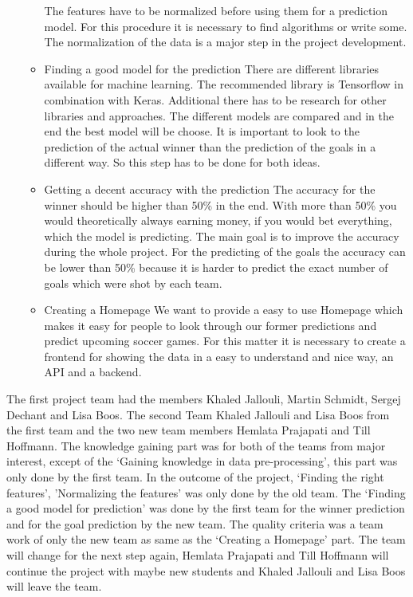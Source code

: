 \begin{itemize}
\begin{itemize}
			The features have to be normalized before using them for a prediction model. For this procedure it is necessary to find algorithms or write some. The normalization of the data is a major step in the project development.
			\item Finding a good model for the prediction\newline 
			There are different libraries available for machine learning. The recommended library is Tensorflow in combination with Keras. Additional there has to be research for other libraries and approaches. The different models are compared and in the end the best model will be choose. It is important to look to the prediction of the actual winner than the prediction of the goals in a different way. So this step has to be done for both ideas.
			\item Getting a decent accuracy with the prediction \newline
			The accuracy for the winner should be higher than 50\% in the end. With more than 50\% you would theoretically always earning money, if you would bet everything, which the model is predicting. The main goal is to improve the accuracy during the whole project. For the predicting of the goals the accuracy can be lower than 50\% because it is harder to predict the exact number of goals which were shot by each team.
			\item Creating a Homepage\newline
			We want to provide a easy to use Homepage which makes it easy for people to look through our former predictions and predict upcoming soccer games. For this matter it is necessary to create a frontend for showing the data in a easy to understand and nice way, an API and a backend. 
		\end{itemize}
\end{itemize}

The first project team had the members Khaled Jallouli, Martin Schmidt, Sergej Dechant and Lisa Boos. The second Team Khaled Jallouli and Lisa Boos from the first team and the two new team members Hemlata Prajapati and Till Hoffmann. The knowledge gaining part was for both of the teams from major interest, except of the `Gaining knowledge in data pre-processing', this part was only done by the first team. In the outcome of the project, `Finding the right features', 'Normalizing the features' was only done by the old team. The `Finding a good model for prediction' was done by the first team for the winner prediction and for the goal prediction by the new team. The quality criteria was a team work of only the new team as same as the `Creating a Homepage' part. The team will change for the next step again, Hemlata Prajapati and Till Hoffmann will continue the project with maybe new students and Khaled Jallouli and Lisa Boos will leave the team.

